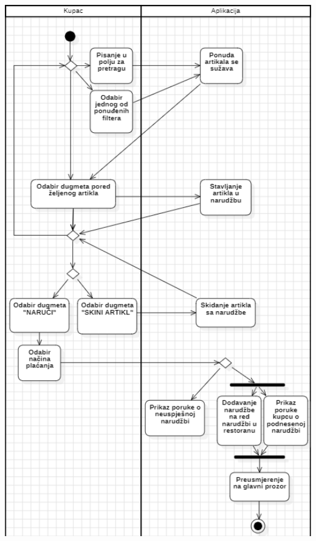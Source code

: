 \documentclass{scrreprt}
\begin{document}
\begin{center}
	\includegraphics[width=14cm]{./img/18.png}
\end{center}

\pagebreak
\end{document}
